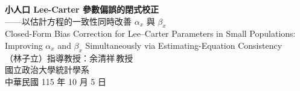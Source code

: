\documentclass[UTF8, fontset=macnew, a4paper, 12pt]{ctexart}
\begin{document}
\begin{center}
{\bfseries 小人口 Lee-Carter 參數偏誤的閉式校正}\\[4pt]
{ ——以估計方程的一致性同時改善 $\alpha_x$ 與 $\beta_x$}\\[6pt]
{ Closed-Form Bias Correction for Lee--Carter Parameters in Small
Populations:}\\[2pt]
{ Improving $\alpha_x$ and $\beta_x$ Simultaneously via
Estimating-Equation Consistency}\\[12pt]
{ （林子立）\quad 指導教授：余清祥\,教授}\\[4pt]
{ 國立政治大學統計學系}\\[4pt]
{ 中華民國 115 年 10 月 5 日}
\end{center}

\vspace{6pt}
\end{document}

